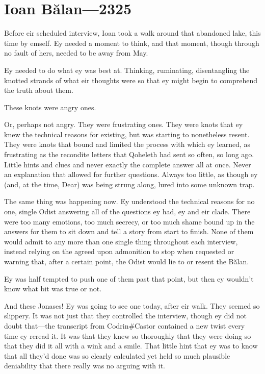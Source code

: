 \hypertarget{ioan-bux103lan-2325}{%
\chapter{Ioan Bălan—2325}\label{ioan-bux103lan-2325}}

Before eir scheduled interview, Ioan took a walk around that abandoned lake, this time by emself. Ey needed a moment to think, and that moment, though through no fault of hers, needed to be away from May.

Ey needed to do what ey was best at. Thinking, ruminating, disentangling the knotted strands of what eir thoughts were so that ey might begin to comprehend the truth about them.

These knots were angry ones.

Or, perhaps not angry. They were frustrating ones. They were knots that ey knew the technical reasons for existing, but was starting to nonetheless resent. They were knots that bound and limited the process with which ey learned, as frustrating as the recondite letters that Qoheleth had sent so often, so long ago. Little hints and clues and never exactly the complete answer all at once. Never an explanation that allowed for further questions. Always too little, as though ey (and, at the time, Dear) was being strung along, lured into some unknown trap.

The same thing was happening now. Ey understood the technical reasons for no one, single Odist answering all of the questions ey had, ey and eir clade. There were too many emotions, too much secrecy, or too much shame bound up in the answers for them to sit down and tell a story from start to finish. None of them would admit to any more than one single thing throughout each interview, instead relying on the agreed upon admonition to stop when requested or warning that, after a certain point, the Odist would lie to or resent the Bălan.

Ey was half tempted to push one of them past that point, but then ey wouldn't know what bit was true or not.

And these Jonases! Ey was going to see one today, after eir walk. They seemed so slippery. It was not just that they controlled the interview, though ey did not doubt that---the transcript from Codrin\#Castor contained a new twist every time ey reread it. It was that they knew so thoroughly that they were doing so that they did it all with a wink and a smile. That little hint that ey was to know that all they'd done was so clearly calculated yet held so much plausible deniability that there really was no arguing with it.

